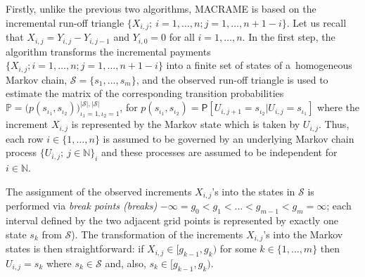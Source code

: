 Firstly, unlike the previous two algorithms, MACRAME is based on the incremental run-off triangle $\{X_{i,j};~i = 1, \dots, n; j = 1, \dots, n + 1 - i\}$. Let us recall that $X_{i,j} = Y_{i,j} - Y_{i, j - 1}$ and $Y_{i, 0} = 0$ for all $i = 1, \dots, n$. In the first step, the algorithm transforms the incremental payments $\{X_{i,j}; i = 1, \dots, n; j = 1, \dots, n + 1 - i\}$ into a finite set  of  states of a~homogeneous Markov chain, $\mathcal{S} = \{s_1, \dots, s_m\}$, and the observed  run-off triangle is used to estimate the matrix of the corresponding transition probabilities $\mathbb{P} = \big(p(s_{\iota_1}, s_{\iota_2})\big)_{\iota_1 = 1, \iota_2 = 1}^{|\mathcal{S}|, |\mathcal{S}|}$, 
for $p(s_{\iota_1}, s_{\iota_2}) = \mathsf{P}[U_{i, j + 1} = s_{\iota_2} | U_{i, j} = s_{\iota_1}]$ where the increment $X_{i, j}$ is represented by the Markov state which is taken by  $U_{i,j}$.  Thus, each row $i \in \{1, \dots, n\}$ is assumed to be governed by an underlying Markov chain process $\{U_{i, j};~j \in \mathbb{N}\}_i$ and these processes are assumed to be independent for $i \in \mathbb{N}$.

The assignment of the observed increments $X_{i,j}$'s into the states in $\mathcal{S}$ is performed via \emph{break points (breaks)}  $- \infty = g_0 < g_1 < \dots < g_{m - 1} < g_m = \infty$; each interval defined by the two adjacent grid points is represented by exactly one state $s_k$ from $\mathcal{S}$). The transformation of the increments $X_{i,j}$'s into the Markov states is then straightforward: if $X_{i, j} \in [g_{k - 1}, g_{k})$ for some $k \in \{1, \dots, m\}$ then $U_{i, j} = s_k$ where $s_{k} \in \mathcal{S}$ and, also, $s_{k} \in [g_{k - 1}, g_{k})$. 

